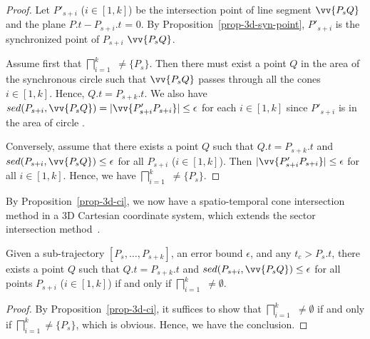 \begin{proof}
Let $P'_{s+i}$ ($i\in[1, k]$) be the intersection point of line segment $\vv{P_sQ}$ and the plane $P.t - P_{s+i}.t$ = $0$.
By Proposition~\ref{prop-3d-syn-point}, $P'_{s+i}$ is the synchronized point of $P_{s+i}$ \wrt $\vv{P_sQ}$.

Assume first that $\bigsqcap_{i=1}^{k}$ $\ne \{P_s\}$. Then there must exist a point $Q $ in the area of the  synchronous circle  such that $\vv{P_sQ}$ passes through all the cones  $i\in[1, k]$. Hence,  $Q.t = P_{s+k}.t$.
We also have $sed(P_{s+i}, \vv{P_sQ}) = |\vv{P'_{s+i}P_{s+i}}| \le \epsilon$ for each $i \in [1, k]$  since $P'_{s+i}$  is in the area of circle  .

Conversely, assume that there exists a point $Q$ such that $Q.t = P_{s+k}.t$ and $sed(P_{s+i}, \vv{P_sQ})\le\epsilon$ for all $P_{s+i}$ ($i \in [1,k]$). Then $|\vv{P'_{s+i}P_{s+i}}| \le \epsilon$ for all $i \in [1, k]$. Hence, we have  $\bigsqcap_{i=1}^{k}$ $\ne \{P_s\}$.
\end{proof}

By Proposition~\ref{prop-3d-ci}, we now have a spatio-temporal cone intersection method in a 3D Cartesian coordinate system, which extends the sector intersection method~\cite{Williams:Longest, Sklansky:Cone, Zhao:Sleeve}.




\begin{prop}
\label{prop-circle-intersection}
Given a sub-trajectory $[P_s,\ldots, P_{s+k}]$, an error bound $\epsilon$, and any $t_c > P_s.t$, there exists a point $Q$ such that $Q.t = P_{s+k}.t$ and $sed(P_{s+i}, \vv{P_sQ})\le \epsilon$ for all points $P_{s+i}$ ($i \in [1,k]$) if and only if $\bigsqcap_{i=1}^{k}$ $\ne \emptyset$.
\end{prop}


\begin{proof}
By Proposition~\ref{prop-3d-ci}, it suffices to show that $\bigsqcap_{i=1}^{k}$  $\ne \emptyset$ if and only if $\bigsqcap_{i=1}^{k}$$\ne \{P_s\}$, which is obvious. Hence, we have the conclusion.
\end{proof}

